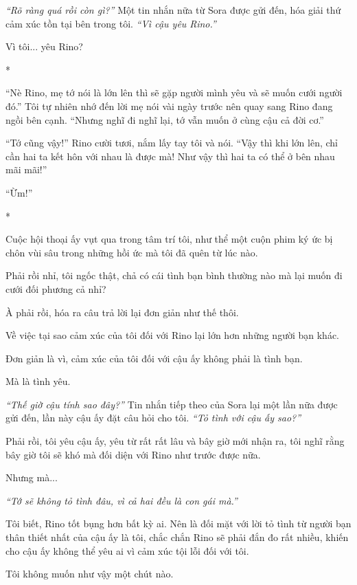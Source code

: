 {    \emph{``Rõ ràng quá rồi còn gì?''} Một tin nhắn nữa từ Sora được gửi
    đến, hóa giải thứ cảm xúc tồn tại bên trong tôi. \emph{``Vì cậu yêu
        Rino.''}

    Vì tôi... yêu Rino?

    *

    ``Nè Rino, mẹ tớ nói là lớn lên thì sẽ gặp người mình yêu và sẽ muốn
    cưới người đó.'' Tôi tự nhiên nhớ đến lời mẹ nói vài ngày trước nên quay
    sang Rino đang ngồi bên cạnh. ``Nhưng nghĩ đi nghĩ lại, tớ vẫn muốn ở
    cùng cậu cả đời cơ.''

    ``Tớ cũng vậy!'' Rino cười tươi, nắm lấy tay tôi và nói. ``Vậy thì khi
    lớn lên, chỉ cần hai ta kết hôn với nhau là được mà! Như vậy thì hai ta
    có thể ở bên nhau mãi mãi!''

    ``Ừm!''

    *

    Cuộc hội thoại ấy vụt qua trong tâm trí tôi, như thể một cuộn phim ký ức
    bị chôn vùi sâu trong những hồi ức mà tôi đã quên từ lúc nào.

    Phải rồi nhỉ, tôi ngốc thật, chả có cái tình bạn bình thường nào mà lại
    muốn đi cưới đối phương cả nhỉ?

    À phải rồi, hóa ra câu trả lời lại đơn giản như thế thôi.

    Về việc tại sao cảm xúc của tôi đối với Rino lại lớn hơn những người bạn
    khác.

    Đơn giản là vì, cảm xúc của tôi đối với cậu ấy không phải là tình bạn.

    Mà là tình yêu.

    \emph{``Thế giờ cậu tính sao đây?''} Tin nhắn tiếp theo của Sora lại một
    lần nữa được gửi đến, lần này cậu ấy đặt câu hỏi cho tôi. \emph{``Tỏ
        tình với cậu ấy sao?''}

    Phải rồi, tôi yêu cậu ấy, yêu từ rất rất lâu và bây giờ mới nhận ra, tôi
    nghĩ rằng bây giờ tôi sẽ khó mà đối diện với Rino như trước được nữa.

    Nhưng mà...

    \emph{``Tớ sẽ không tỏ tình đâu, vì cả hai đều là con gái mà.''}

    Tôi biết, Rino tốt bụng hơn bất kỳ ai. Nên là đối mặt với lời tỏ tình từ
    người bạn thân thiết nhất của cậu ấy là tôi, chắc chắn Rino sẽ phải đắn
    đo rất nhiều, khiến cho cậu ấy không thể yêu ai vì cảm xúc tội lỗi đối
    với tôi.

    Tôi không muốn như vậy một chút nào.

}
